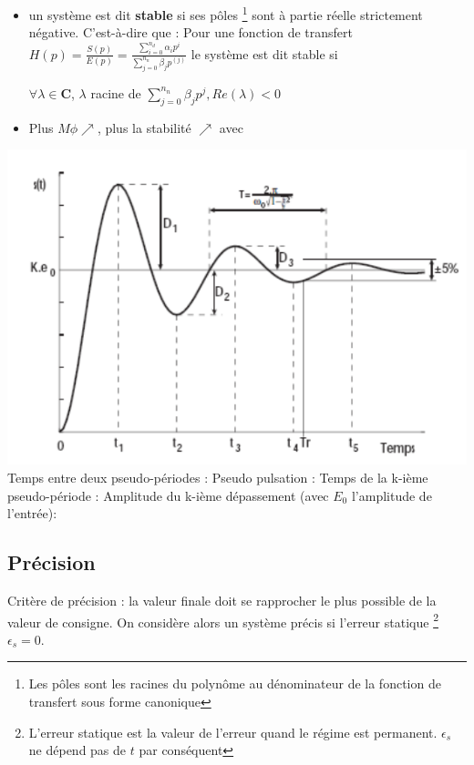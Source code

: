 \begin{itemize}
    \item un système est dit \textbf{stable} si ses pôles \footnote{Les pôles sont les racines du polynôme au dénominateur de la fonction de transfert sous forme canonique} sont à partie réelle strictement négative. C'est-à-dire que : \newline
Pour une fonction de transfert \newline \large{$H(p)=\frac{S(p)}{E(p)}=\frac{\sum_{i=0}^{n_d} \alpha_{i} p^{i}}
{\sum_{j=0}^{n_n} \beta_{j} p^(j)}$} le système est dit stable si \newline

\Large{$\forall \lambda \in \mathbf{C}$, $\lambda$ racine de $\sum_{j=0}^{n_n} \beta_{j} p^{j}, Re(\lambda) < 0$}
    \item Plus $M\phi \nearrow$, plus la stabilité $\nearrow$ avec 
\end{itemize}
\includegraphics[scale=0.87]{Pics/stab.png} \newline
Temps entre deux pseudo-périodes :      \newline
Pseudo pulsation :     
\newpage
Temps de la k-ième pseudo-période : 
Amplitude du k-ième dépassement (avec $E_{0}$ l'amplitude de l'entrée):
\begin{center}
\end{center}
\subsection{Précision}
Critère de précision : la valeur finale doit se rapprocher le plus possible de la valeur de consigne. On considère alors un système précis si l'erreur statique \footnote{L'erreur statique est la valeur de l'erreur quand le régime est permanent. $\epsilon_{s}$ ne dépend pas de $t$ par conséquent} $\epsilon_s = 0$. \newline

